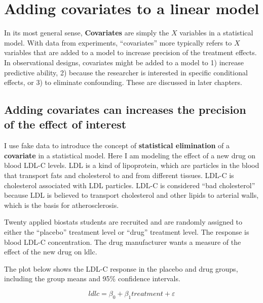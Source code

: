 \documentclass[]{book}
\begin{document}
\hypertarget{adding-covariates-to-a-linear-model}{%
\chapter{Adding covariates to a linear model}\label{adding-covariates-to-a-linear-model}}

In its most general sense, \textbf{Covariates} are simply the \(X\) variables in a statistical model. With data from experiments, ``covariates'' more typically refers to \(X\) variables that are added to a model to increase precision of the treatment effects. In observational designs, covariates might be added to a model to 1) increase predictive ability, 2) because the researcher is interested in specific conditional effects, or 3) to eliminate confounding. These are discussed in later chapters.

\hypertarget{adding-covariates-can-increases-the-precision-of-the-effect-of-interest}{%
\section{Adding covariates can increases the precision of the effect of interest}\label{adding-covariates-can-increases-the-precision-of-the-effect-of-interest}}

I use fake data to introduce the concept of \textbf{statistical elimination} of a \textbf{covariate} in a statistical model. Here I am modeling the effect of a new drug on blood LDL-C levels. LDL is a kind of lipoprotein, which are particles in the blood that transport fats and cholesterol to and from different tissues. LDL-C is cholesterol associated with LDL particles. LDL-C is considered ``bad cholesterol'' because LDL is believed to transport cholesterol and other lipids to arterial walls, which is the basis for atherosclerosis.

Twenty applied biostats students are recruited and are randomly assigned to either the ``placebo'' treatment level or ``drug'' treatment level. The response is blood LDL-C concentration. The drug manufacturer wants a measure of the effect of the new drug on ldlc.

The plot below shows the LDL-C response in the placebo and drug groups, including the group means and 95\% confidence intervals.

\begin{equation}
ldlc = \beta_0 + \beta_1 treatment + \varepsilon
\label{eq:cov-no-cov}
\end{equation}
\end{document}
